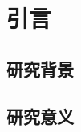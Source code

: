 \chapter{引言}\label{chap:introduction}

\section{研究背景}\label{sec:research_background}
\section{研究意义}\label{sec:research_meaning}